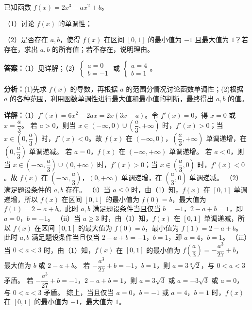 \begin{question}[points=12]
已知函数 $f(x)=2x^3-ax^2+b$。

（1）讨论 $f(x)$ 的单调性；

（2）是否存在 $a,b$，使得 $f(x)$ 在区间 $[0,1]$ 的最小值为 $-1$ 且最大值为 $1$？若存在，求出 $a,b$ 的所有值；若不存在，说明理由。
\begin{solution}
\textbf{答案：}（1）见详解；（2）$\begin{cases} a=0 \\ b=-1 \end{cases}$ 或 $\begin{cases} a=4 \\ b=1 \end{cases}$。

\textbf{分析：}(1)先求 $f(x)$ 的导数，再根据 $a$ 的范围分情况讨论函数单调性；(2)根据 $a$ 的各种范围，利用函数单调性进行最大值和最小值的判断，最终得出 $a,b$ 的值。

\textbf{详解：}（1）$f'(x)=6x^2-2ax=2x(3x-a)$。令 $f'(x)=0$，得 $x=0$ 或 $x=\dfrac{a}{3}$。
若 $a>0$，则当 $x\in(-\infty,0)\cup\left(\dfrac{a}{3},+\infty\right)$ 时，$f'(x)>0$；当 $x\in\left(0,\dfrac{a}{3}\right)$ 时，$f'(x)<0$。故 $f(x)$ 在 $(-\infty,0)$，$\left(\dfrac{a}{3},+\infty\right)$ 单调递增，在 $\left(0,\dfrac{a}{3}\right)$ 单调递减。
若 $a=0$，$f(x)$ 在 $(-\infty,+\infty)$ 单调递增。
若 $a<0$，则当 $x\in\left(-\infty,\dfrac{a}{3}\right)\cup(0,+\infty)$ 时，$f'(x)>0$；当 $x\in\left(\dfrac{a}{3},0\right)$ 时，$f'(x)<0$。故 $f(x)$ 在 $\left(-\infty,\dfrac{a}{3}\right)$，$(0,+\infty)$ 单调递增，在 $\left(\dfrac{a}{3},0\right)$ 单调递减。
（2）满足题设条件的 $a,b$ 存在。
（i）当 $a\le 0$ 时，由（1）知，$f(x)$ 在 $[0,1]$ 单调递增，所以 $f(x)$ 在区间 $[0,1]$ 的最小值为 $f(0)=b$，最大值为 $f(1)=2-a+b$。此时 $a,b$ 满足题设条件当且仅当 $b=-1$，$2-a+b=1$，即 $a=0$，$b=-1$。
（ii）当 $a\ge 3$ 时，由（1）知，$f(x)$ 在 $[0,1]$ 单调递减，所以 $f(x)$ 在区间 $[0,1]$ 的最大值为 $f(0)=b$，最小值为 $f(1)=2-a+b$。此时 $a,b$ 满足题设条件当且仅当 $2-a+b=-1$，$b=1$，即 $a=4$，$b=1$。
（iii）当 $0<a<3$ 时，由（1）知，$f(x)$ 在 $[0,1]$ 的最小值为 $f\left(\dfrac{a}{3}\right)=-\dfrac{a^3}{27}+b$，最大值为 $b$ 或 $2-a+b$。
若 $-\dfrac{a^3}{27}+b=-1$，$b=1$，则 $a=3\sqrt[3]{2}$，与 $0<a<3$ 矛盾。
若 $-\dfrac{a^3}{27}+b=-1$，$2-a+b=1$，则 $a=3\sqrt{3}$ 或 $a=-3\sqrt{3}$ 或 $a=0$，与 $0<a<3$ 矛盾。
综上，当且仅当 $a=0$，$b=-1$ 或 $a=4$，$b=1$ 时，$f(x)$ 在 $[0,1]$ 的最小值为 $-1$，最大值为 $1$。
\end{solution}
\end{question}

